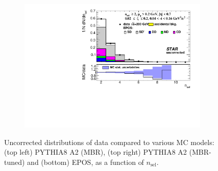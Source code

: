 \begin{figure}[h!]
\begin{subfigure}{.49\textwidth}
		\includegraphics[width=\linewidth, page=1]{chapters/chrgSTAR/img/nonSD/chrg/SDT_epos_xi0_RP_starsim_nsel.pdf}
	\end{subfigure}
	\begin{minipage}{.49\textwidth}
		\caption{Uncorrected distributions of data compared to various MC models: (top left) PYTHIA8 A2 (MBR), (top right) PYTHIA8 A2 (MBR-tuned) and (bottom) EPOS, as a function of $n_{\mathrm{sel}}$.}
		\label{fig:nonSDnsel}
	\end{minipage}
	
\end{figure}
